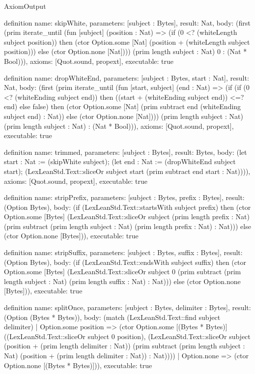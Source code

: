 \begin{lexlean}{AxiomOutput}
\begin{semanticmodule}
definition{
  name: skipWhite,
  parameters: [subject : Bytes],
  result: Nat,
  body: (first (prim iterate_until (fun [subject] (position : Nat) => (if (0 <? (whiteLength subject position)) then (ctor Option.some [Nat] (position + (whiteLength subject position))) else (ctor Option.none [Nat]))) (prim length subject : Nat) 0 : (Nat * Bool))),
  axioms: [Quot.sound, propext],
  executable: true
}

definition{
  name: dropWhiteEnd,
  parameters: [subject : Bytes, start : Nat],
  result: Nat,
  body: (first (prim iterate_until (fun [start, subject] (end : Nat) => (if (if (0 <? (whiteEnding subject end)) then ((start + (whiteEnding subject end)) <=? end) else false) then (ctor Option.some [Nat] (prim subtract end (whiteEnding subject end) : Nat)) else (ctor Option.none [Nat]))) (prim length subject : Nat) (prim length subject : Nat) : (Nat * Bool))),
  axioms: [Quot.sound, propext],
  executable: true
}

definition{
  name: trimmed,
  parameters: [subject : Bytes],
  result: Bytes,
  body: (let start : Nat := (skipWhite subject); (let end : Nat := (dropWhiteEnd subject start); (LexLeanStd.Text::sliceOr subject start (prim subtract end start : Nat)))),
  axioms: [Quot.sound, propext],
  executable: true
}

definition{
  name: stripPrefix,
  parameters: [subject : Bytes, prefix : Bytes],
  result: (Option Bytes),
  body: (if (LexLeanStd.Text::startsWith subject prefix) then (ctor Option.some [Bytes] (LexLeanStd.Text::sliceOr subject (prim length prefix : Nat) (prim subtract (prim length subject : Nat) (prim length prefix : Nat) : Nat))) else (ctor Option.none [Bytes])),
  executable: true
}

definition{
  name: stripSuffix,
  parameters: [subject : Bytes, suffix : Bytes],
  result: (Option Bytes),
  body: (if (LexLeanStd.Text::endsWith subject suffix) then (ctor Option.some [Bytes] (LexLeanStd.Text::sliceOr subject 0 (prim subtract (prim length subject : Nat) (prim length suffix : Nat) : Nat))) else (ctor Option.none [Bytes])),
  executable: true
}

definition{
  name: splitOnce,
  parameters: [subject : Bytes, delimiter : Bytes],
  result: (Option (Bytes * Bytes)),
  body: (match (LexLeanStd.Text::find subject delimiter)
    | Option.some position => (ctor Option.some [(Bytes * Bytes)] ((LexLeanStd.Text::sliceOr subject 0 position), (LexLeanStd.Text::sliceOr subject (position + (prim length delimiter : Nat)) (prim subtract (prim length subject : Nat) (position + (prim length delimiter : Nat)) : Nat))))
    | Option.none => (ctor Option.none [(Bytes * Bytes)])),
  executable: true
}


\end{semanticmodule}
\end{lexlean}
